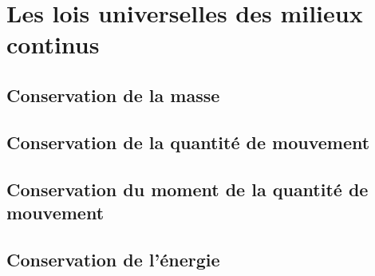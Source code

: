 \chapter{Les lois universelles des milieux continus}
\section{Conservation de la masse}
\section{Conservation de la quantité de mouvement}
\section{Conservation du moment de la quantité de mouvement}
\section{Conservation de l'énergie}
